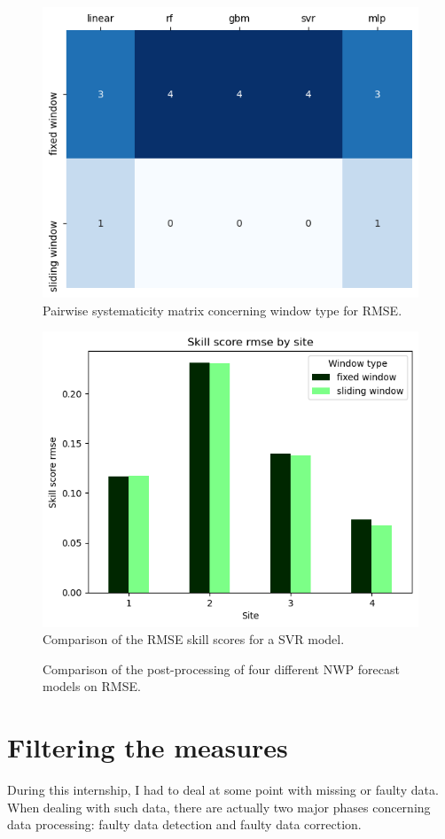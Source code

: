 \begin{figure}[htb!]
    \centering
    \includegraphics[width=0.6\columnwidth]{figures/first_study/comp_window_rmse.png}
\caption{Pairwise systematicity matrix concerning window type for RMSE.}
\end{figure}

\begin{figure}[htb!]
    \centering
    \includegraphics[width=0.85\columnwidth]{figures/first_study/comp_window_rmse_mlp.png}
\caption{Comparison of the RMSE skill scores for a SVR model.}
\end{figure}

\begin{figure}[htb!]
    \centering
    
\caption{Comparison of the post-processing of four different NWP forecast models on RMSE.}
\end{figure}

\clearpage

\section{Filtering the measures}
\label{sec:filtering}
During this internship, I had to deal at some point with missing or faulty data.
When dealing with such data, there are actually two major phases concerning data processing: faulty data detection and faulty data correction.

